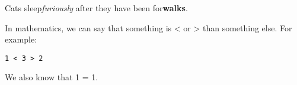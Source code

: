 \documentclass[11pt]{article}
\begin{document}
   Cats sleep\textit{furiously} after they have been for\textbf{walks}.

   In mathematics, we can say that something is < or > than something else. For example:

\begin{verbatim}1 < 3 > 2
\end{verbatim}   We also know that 1 = 1.
\end{document}
